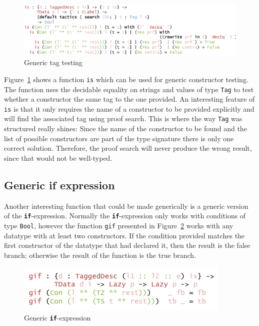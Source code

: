 \documentclass{ituthesis}
\newcommand{\tttype}[1]{\textcolor{type-color}{\texttt{#1}}}
\newcommand{\ttdec}[1]{\textcolor{declared-var-color}{\texttt{#1}}}
\theoremstyle{break}
\begin{document}
\begin{figure}[ht]
\begin{center}
    \includegraphics[scale=0.5]{Figures/GenericIs.png}
\end{center}
\caption{Generic tag testing}
\label{fig:isgen}
\end{figure}

Figure~\ref{fig:isgen} shows a function \ttdec{is} which can be used for generic constructor testing.
The function uses the decidable equality on strings and values of type \tttype{Tag} to test whether a constructor the same tag to the one provided.
An interesting feature of \ttdec{is} is that it only requires the name of a constructor to be provided explicitly and will find the associated tag using proof search.
This is where the way \tttype{Tag} was structured really shines: Since the name of the constructor to be found and the list of possible constructors are part of the type signature
there is only one correct solution.
Therefore, the proof search will never produce the wrong result, since that would not be well-typed.

\subsection{Generic if expression}
\label{sub:Generic if expression}
Another interesting function that could be made generically is a generic version of the \texttt{\textbf{if}}-expression.
Normally the \texttt{\textbf{if}}-expression only works with conditions of type \tttype{Bool}, however the function \ttdec{gif} presented in Figure~\ref{fig:ifgen} works with any datatype with at least two constructors.
If the condition provided matches the first constructor of the datatype that had declared it, then the result is the false branch; otherwise the result of the function is the true branch.

\begin{figure}[ht]
\begin{center}
    \includegraphics[scale=0.5]{Figures/GenericIf.png}
\end{center}
\caption{Generic \texttt{\textbf{if}}-expression}
\label{fig:ifgen}
\end{figure}
\end{document}
